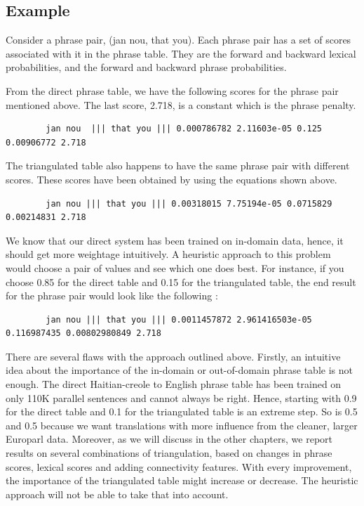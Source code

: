 	\subsection{Example}
		Consider a phrase pair, (jan nou, that you). Each phrase pair has a set of scores associated with it in the phrase table. They are the forward and backward lexical probabilities, and the forward and backward phrase probabilities. 

		From the direct phrase table, we have the following scores for the phrase pair mentioned above. The last score, 2.718, is a constant which is the phrase penalty. 
	\begin{verbatim}
		jan nou  ||| that you ||| 0.000786782 2.11603e-05 0.125 0.00906772 2.718 
	\end{verbatim}

		The triangulated table also happens to have the same phrase pair with different scores. These scores have been obtained by using the equations shown above.
	\begin{verbatim}
		jan nou ||| that you ||| 0.00318015 7.75194e-05 0.0715829 0.00214831 2.718
	\end{verbatim}

		We know that our direct system has been trained on in-domain data, hence, it should get more weightage intuitively. A heuristic approach to this problem would choose a pair of values and see which one does best. For instance, if you choose 0.85 for the direct table and 0.15 for the triangulated table, the end result for the phrase pair would look like the following : 

	\begin{verbatim}
		jan nou ||| that you ||| 0.0011457872 2.961416503e-05 0.116987435 0.00802980849 2.718	
	\end{verbatim}

		There are several flaws with the approach outlined above. Firstly, an intuitive idea about the importance of the in-domain or out-of-domain phrase table is not enough. The direct Haitian-creole to English phrase table has been trained on only 110K parallel sentences and cannot always be right. Hence, starting with 0.9 for the direct table and 0.1 for the triangulated table is an extreme step. So is 0.5 and 0.5 because we want translations with more influence from the cleaner, larger Europarl data. Moreover, as we will discuss in the other chapters, we report results on several combinations of triangulation, based on changes in phrase scores, lexical scores and adding connectivity features. With every improvement, the importance of the triangulated table might increase or decrease. The heuristic approach will not be able to take that into account. 

